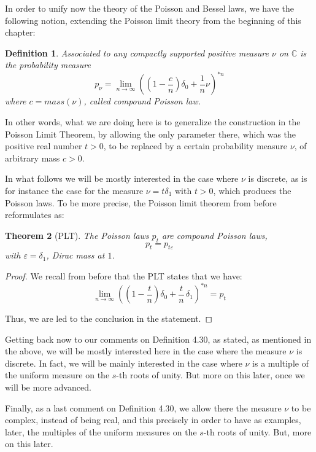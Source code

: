 \documentclass[12pt]{amsbook}
\newtheorem{theorem}{Theorem}[chapter]
\newtheorem{definition}[theorem]{Definition}
\begin{document}
In order to unify now the theory of the Poisson and Bessel laws, we have the following notion, extending the Poisson limit theory from the beginning of this chapter:


\begin{definition}
Associated to any compactly supported positive measure $\nu$ on $\mathbb C$ is the probability measure
$$p_\nu=\lim_{n\to\infty}\left(\left(1-\frac{c}{n}\right)\delta_0+\frac{1}{n}\nu\right)^{*n}$$
where $c=mass(\nu)$, called compound Poisson law.
\end{definition}

In other words, what we are doing here is to generalize the construction in the Poisson Limit Theorem, by allowing the only parameter there, which was the positive real number $t>0$, to be replaced by a certain probability measure $\nu$, of arbitrary mass $c>0$.

\bigskip

In what follows we will be mostly interested in the case where $\nu$ is discrete, as is for instance the case for the measure $\nu=t\delta_1$ with $t>0$, which produces the Poisson laws. To be more precise, the Poisson limit theorem from before reformulates as:

\begin{theorem}[PLT]
The Poisson laws $p_t$ are compound Poisson laws,
$$p_t=p_{t\varepsilon}$$
with $\varepsilon=\delta_1$, Dirac mass at $1$.
\end{theorem}

\begin{proof}
We recall from before that the PLT states that we have:
$$\lim_{n\to\infty}\left(\left(1-\frac{t}{n}\right)\delta_0+\frac{t}{n}\,\delta_1\right)^{*n}=p_t$$

Thus, we are led to the conclusion in the statement.
\end{proof}

Getting back now to our comments on Definition 4.30, as stated, as mentioned in the above, we will be mostly interested here in the case where the measure $\nu$ is discrete. In fact, we will be mainly interested in the case where $\nu$ is a multiple of the uniform measure on the $s$-th roots of unity. But more on this later, once we will be more advanced.

\bigskip

Finally, as a last comment on Definition 4.30, we allow there the measure $\nu$ to be complex, instead of being real, and this precisely in order to have as examples, later, the multiples of the uniform measures on the $s$-th roots of unity. But, more on this later.
\end{document}
